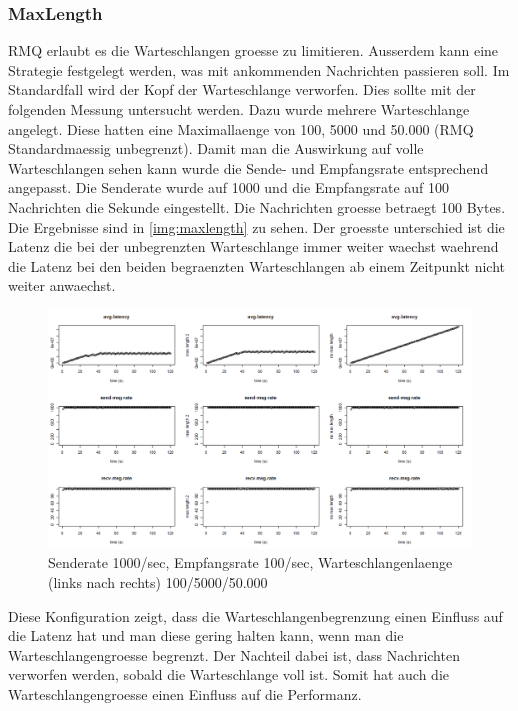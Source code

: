 


\subsubsection{MaxLength}
\label{subsub:maxlength}
RMQ erlaubt es die Warteschlangen groesse zu limitieren. Ausserdem kann eine Strategie festgelegt werden, was mit ankommenden Nachrichten passieren soll. Im Standardfall wird der Kopf der Warteschlange verworfen. Dies sollte mit der folgenden Messung untersucht werden. Dazu wurde mehrere Warteschlange angelegt. Diese hatten eine Maximallaenge von 100, 5000 und 50.000 (RMQ Standardmaessig unbegrenzt). Damit man die Auswirkung auf volle Warteschlangen sehen kann wurde die Sende- und Empfangsrate entsprechend angepasst. Die Senderate wurde auf 1000 und die Empfangsrate auf 100 Nachrichten die Sekunde eingestellt. Die Nachrichten groesse betraegt 100 Bytes.
Die Ergebnisse sind in \autoref{img:maxlength} zu sehen. Der groesste unterschied ist die Latenz die bei der unbegrenzten Warteschlange immer weiter waechst waehrend die Latenz bei den beiden begraenzten Warteschlangen ab einem Zeitpunkt nicht weiter anwaechst. 
\begin{figure}
\center
  \includegraphics[width=1\textwidth]{images/max-length.png}
  \caption{Senderate 1000/sec, Empfangsrate 100/sec, Warteschlangenlaenge (links nach rechts) 100/5000/50.000}
  \label{img:maxlength}
\end{figure}
Diese Konfiguration zeigt, dass die Warteschlangenbegrenzung einen Einfluss auf die Latenz hat und man diese gering halten kann, wenn man die Warteschlangengroesse begrenzt. Der Nachteil dabei ist, dass Nachrichten verworfen werden, sobald die Warteschlange voll ist. Somit hat auch die Warteschlangengroesse einen Einfluss auf die Performanz. 

